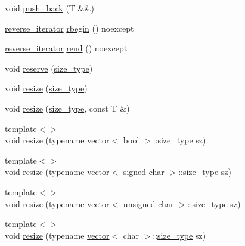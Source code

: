 \begin{DoxyCompactItemize}
\item 
void \mbox{\hyperlink{classvector_a1b36a29ecdb3c4f319332698a216115e}{push\+\_\+back}} (T \&\&)
\item 
\mbox{\hyperlink{classvector_a92b881db836646f4039adcbb73c8595f}{reverse\+\_\+iterator}} \mbox{\hyperlink{classvector_ae35d513907ca2b5783ebebe7e6823ef4}{rbegin}} () noexcept
\item 
\mbox{\hyperlink{classvector_a92b881db836646f4039adcbb73c8595f}{reverse\+\_\+iterator}} \mbox{\hyperlink{classvector_ad92c79d29b7df0bb6e5daea24ac7f3f4}{rend}} () noexcept
\item 
void \mbox{\hyperlink{classvector_a2beec78f129da6662f0e279b83d31904}{reserve}} (\mbox{\hyperlink{classvector_ada51e68d31936547d3729c82daf6b7c6}{size\+\_\+type}})
\item 
void \mbox{\hyperlink{classvector_add2eb5b04f92dc2f8aff3d32b42fb59d}{resize}} (\mbox{\hyperlink{classvector_ada51e68d31936547d3729c82daf6b7c6}{size\+\_\+type}})
\item 
void \mbox{\hyperlink{classvector_a88e37926adc92244ac0d63741f11dbf5}{resize}} (\mbox{\hyperlink{classvector_ada51e68d31936547d3729c82daf6b7c6}{size\+\_\+type}}, const T \&)
\item 
{\footnotesize template$<$$>$ }\\void \mbox{\hyperlink{classvector_a620a4c973688e2be36b69309c04703ef}{resize}} (typename \mbox{\hyperlink{classvector}{vector}}$<$ bool $>$\+::\mbox{\hyperlink{classvector_ada51e68d31936547d3729c82daf6b7c6}{size\+\_\+type}} sz)
\item 
{\footnotesize template$<$$>$ }\\void \mbox{\hyperlink{classvector_a40a3c7aea0a1f3611a8e662ac4fda28d}{resize}} (typename \mbox{\hyperlink{classvector}{vector}}$<$ signed char $>$\+::\mbox{\hyperlink{classvector_ada51e68d31936547d3729c82daf6b7c6}{size\+\_\+type}} sz)
\item 
{\footnotesize template$<$$>$ }\\void \mbox{\hyperlink{classvector_a1f16617e21bfccf3985000999f32433b}{resize}} (typename \mbox{\hyperlink{classvector}{vector}}$<$ unsigned char $>$\+::\mbox{\hyperlink{classvector_ada51e68d31936547d3729c82daf6b7c6}{size\+\_\+type}} sz)
\item 
{\footnotesize template$<$$>$ }\\void \mbox{\hyperlink{classvector_a2661dfb4d73466523d9e9a2b723abe70}{resize}} (typename \mbox{\hyperlink{classvector}{vector}}$<$ char $>$\+::\mbox{\hyperlink{classvector_ada51e68d31936547d3729c82daf6b7c6}{size\+\_\+type}} sz)

\end{DoxyCompactItemize}
